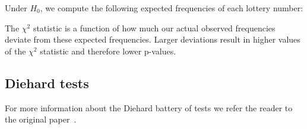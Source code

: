 

Under $H_0$, we compute the following expected frequencies of each lottery number: 

The $\chi^2$ statistic is a function of how much our actual observed frequencies deviate from these expected frequencies. 
Larger deviations result in higher values of the $\chi^2$ statistic and therefore lower p-values.




\subsection{Diehard tests}

For more information about the Diehard battery of tests we refer the reader to the original paper~\cite{currentRNG}.
